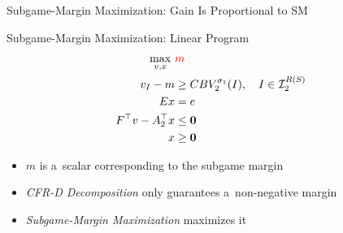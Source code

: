 \documentclass{beamer}
\theoremstyle{definition}
\newcommand{\vect}[1]{\boldsymbol{#1}}
\newcommand{\I}{\mathcal{I}}
\begin{document}
{\begin{frame}{Subgame-Margin Maximization: Gain Is Proportional to SM}
    \end{frame}

    \begin{frame}{Subgame-Margin Maximization: Linear Program}
      \begin{equation*}
        \label{lp:max-margin}
        \begin{split}
          \max_{v, x}\ &\textcolor{red}{m} \\
          v_I - m &\ge CBV_2^{\sigma_1}(I), \quad I \in \I_2^{R(S)}\\ 
          Ex &= e \\
          F^\top v - A_2^\top x &\le \vect{0} \\
          x &\ge \vect{0}
        \end{split}
      \end{equation*}
      \pause

      \begin{itemize}[<+- | alert@+>]
        \item $m$ is a~scalar corresponding to the subgame margin
        \item \emph{CFR-D Decomposition} only guarantees a~non-negative margin
        \item \emph{Subgame-Margin Maximization} maximizes it
      \end{itemize}
    \end{frame}

}
\end{document}
